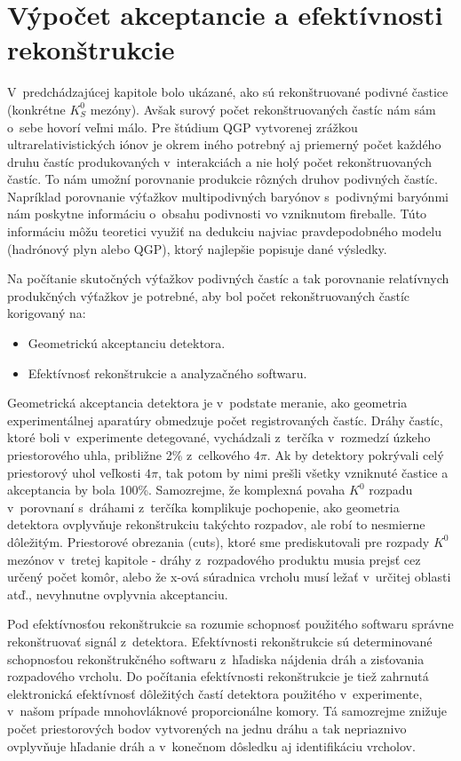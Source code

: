 
%
\chapter{Výpočet akceptancie a efektívnosti rekonštrukcie}
V~predchádzajúcej kapitole bolo ukázané, ako sú rekonštruované podivné častice
(konkrétne $K^{0}_{S}$ mezóny). Avšak surový počet rekonštruovaných častíc
nám  sám o~sebe hovorí veľmi málo. Pre štúdium QGP vytvorenej zrážkou
ultrarelativistických iónov je okrem iného potrebný aj priemerný počet
každého druhu častíc produkovaných v~interakciách a nie holý počet
rekonštruovaných častíc. To nám umožní porovnanie produkcie rôzných druhov
podivných častíc. Napríklad porovnanie výťažkov multipodivných baryónov
s~podivnými baryónmi nám poskytne informáciu o~obsahu podivnosti vo
vzniknutom  fireballe. Túto informáciu môžu teoretici využiť na dedukciu
najviac pravdepodobného modelu (hadrónový plyn alebo QGP), ktorý najlepšie
popisuje dané výsledky.

Na počítanie skutočných výťažkov podivných častíc  a tak porovnanie
relatívnych produkčných výťažkov je potrebné, aby bol počet rekonštruovaných
častíc korigovaný na:
\begin{itemize}
\item{Geometrickú akceptanciu detektora.}
\item{Efektívnosť rekonštrukcie a analyzačného softwaru.}
\end{itemize}
Geometrická akceptancia detektora je v~podstate meranie, ako geometria
experimentálnej aparatúry obmedzuje počet registrovaných častíc. Dráhy
častíc, ktoré boli v~experimente detegované, vychádzali z~terčíka v~rozmedzí
úzkeho priestorového uhla, približne 2\% z~celkového  $4\pi$. Ak by detektory
pokrývali celý priestorový uhol veľkosti $4\pi$, tak potom by nimi prešli
všetky vzniknuté častice a akceptancia by bola 100\%. Samozrejme, že
komplexná povaha $K^{0}$ rozpadu v~porovnaní s~dráhami z~terčíka komplikuje
pochopenie, ako geometria detektora ovplyvňuje rekonštrukciu takýchto
rozpadov, ale robí to nesmierne dôležitým. Priestorové obrezania (cuts),
ktoré sme prediskutovali pre rozpady $K^{0}$ mezónov v~tretej kapitole -
dráhy z~rozpadového produktu musia prejsť cez určený počet komôr,
alebo že x-ová súradnica vrcholu musí ležať v~určitej oblasti atď.,
nevyhnutne ovplyvnia akceptanciu.

Pod efektívnosťou rekonštrukcie sa rozumie schopnosť  použitého softwaru
správne rekonštruovať signál z~detektora. Efektívnosti rekonštrukcie
sú determinované schopnosťou  rekonštrukčného softwaru  z~hľadiska nájdenia
dráh a zisťovania rozpadového vrcholu. Do počítania efektívnosti
rekonštrukcie je tiež zahrnutá  elektronická efektívnosť dôležitých častí
detektora použitého v~experimente, v~našom prípade mnohovláknové
proporcionálne komory. Tá samozrejme znižuje počet priestorových bodov
vytvorených na jednu dráhu a tak nepriaznivo ovplyvňuje hľadanie dráh a
v~konečnom dôsledku aj identifikáciu vrcholov.


